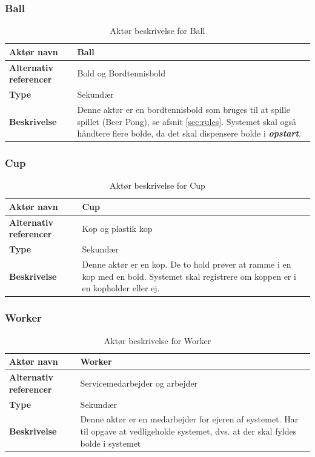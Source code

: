 \documentclass[Kravspecifikation/Kravspec_Main.tex]{subfiles}
\begin{document}
\subsubsection{Ball}
\begin{table}[H]
    \centering
    \begin{tabular}{|L{0.35\textwidth}|L{0.65\textwidth}|}
        \hline
        \textbf{Aktør navn} & Ball \\ \hline
        \textbf{Alternativ referencer} & Bold og Bordtennisbold \\ \hline
        \textbf{Type} & Sekundær \\ \hline
        \textbf{Beskrivelse} & Denne aktør er en bordtennisbold som bruges til at spille spillet (Beer Pong), se afsnit \ref{sec:rules}. Systemet skal også håndtere flere bolde, da det skal dispensere bolde i \textbf{\textit{opstart}}.\\ \hline
    \end{tabular}
    \caption{Aktør beskrivelse for Ball}
    \label{tab:BallBeskrivelse}
\end{table}

\subsubsection{Cup}
\begin{table}[H]
    \centering
    \begin{tabular}{|L{0.35\textwidth}|L{0.65\textwidth}|}
        \hline
        \textbf{Aktør navn} &  Cup\\ \hline
        \textbf{Alternativ referencer} &  Kop og plastik kop\\ \hline
        \textbf{Type} & Sekundær \\ \hline
        \textbf{Beskrivelse} & Denne aktør er en kop. De to hold prøver at ramme i en kop med en bold. Systemet skal registrere om koppen er i en kopholder eller ej.  \\ \hline
    \end{tabular}
    \caption{Aktør beskrivelse for Cup}
    \label{tab:CupBeskrivelse}
\end{table}

\subsubsection{Worker}
\begin{table}[H]
    \centering
    \begin{tabular}{|L{0.35\textwidth}|L{0.65\textwidth}|}
        \hline
        \textbf{Aktør navn} & Worker \\ \hline
        \textbf{Alternativ referencer} & Servicemedarbejder og arbejder \\ \hline
        \textbf{Type} & Sekundær\\ \hline
        \textbf{Beskrivelse} & Denne aktør er en medarbejder for ejeren af systemet. Har til opgave at vedligeholde systemet, dvs. at der skal fyldes bolde i systemet\\ \hline
    \end{tabular}
    \caption{Aktør beskrivelse for Worker}
    \label{tab:WorkerBeskrivelse}
\end{table}
\end{document}
